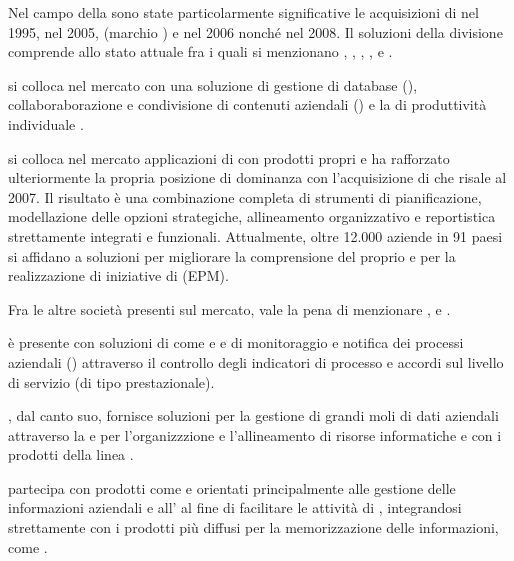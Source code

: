 Nel campo della \bsn {} sono state particolarmente significative le acquisizioni di  nel 1995,  nel 2005,  (marchio ) e  nel 2006 nonché  nel 2008. Il  soluzioni della divisione  comprende allo stato attuale  fra i quali si menzionano , , , ,  e .

 si colloca nel mercato con una soluzione di gestione di database (), collaboraborazione e condivisione di contenuti aziendali () e la  di produttività individuale .

 si colloca nel mercato applicazioni di \bsn {} con prodotti propri e ha rafforzato ulteriormente la propria posizione di dominanza con l'acquisizione di  che risale al 2007. Il risultato è una combinazione completa di strumenti di pianificazione, modellazione delle opzioni strategiche, allineamento organizzativo e reportistica strettamente integrati e funzionali. Attualmente, oltre 12.000 aziende in 91 paesi si affidano a soluzioni  per migliorare la comprensione del proprio \bsn e per la realizzazione di iniziative di  (EPM).

Fra le altre società presenti sul mercato, vale la pena di menzionare ,  e .

 è presente con soluzioni di  come  e  e \sw di monitoraggio e notifica dei processi aziendali () attraverso il controllo degli indicatori di processo  e accordi sul livello di servizio (di tipo prestazionale).

, dal canto suo, fornisce soluzioni per la gestione di grandi moli di dati aziendali attraverso la   e per l'organizzzione e l'allineamento di risorse informatiche e  con i prodotti della linea .

 partecipa con prodotti come  e  orientati principalmente alle gestione delle informazioni aziendali e all' al fine di facilitare le attività di , integrandosi strettamente con i prodotti  più diffusi per la memorizzazione delle informazioni, come .

